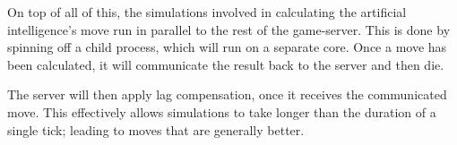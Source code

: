 \documentclass{standalone}
\begin{document}
		On top of all of this, the simulations involved in calculating the artificial intelligence's move run in parallel to the rest of the game-server. This is done by spinning off a child process, which will run on a separate core. Once a move has been calculated, it will communicate the result back to the server and then die.

		The server will then apply lag compensation, once it receives the communicated move. This effectively allows simulations to take longer than the duration of a single tick; leading to moves that are generally better.
\end{document}
